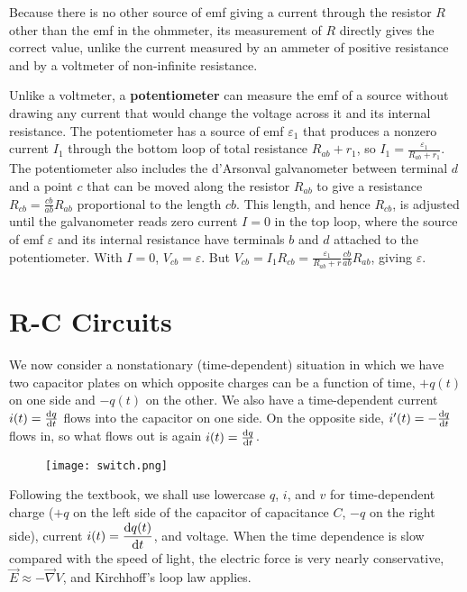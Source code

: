 Because there is no other source of emf giving a current through the resistor $R$ other than the emf in the ohmmeter, its measurement of $R$ directly gives the correct value, unlike the current measured by an ammeter of positive resistance and by a voltmeter of non-infinite resistance.

Unlike a voltmeter, a \textbf{potentiometer} can measure the emf of a source without drawing any current that would change the voltage across it and its internal resistance. The potentiometer has a source of emf $\varepsilon_1$ that produces a nonzero current $I_1$ through the bottom loop of total resistance $R_{ab} + r_1$, so $I_1 = \frac{\varepsilon_1}{R_{ab}+r_1}$. The potentiometer also includes the d'Arsonval galvanometer between terminal $d$ and a point $c$ that can be moved along the resistor $R_{ab}$ to give a resistance $R_{cb} = \frac{cb}{ab}R_{ab}$ proportional to the length $cb$. This length, and hence $R_{cb}$, is adjusted until the galvanometer reads zero current $I = 0$ in the top loop, where the source of emf $\varepsilon$ and its internal resistance have terminals $b$ and $d$ attached to the potentiometer. With $I=0$, $V_{cb} = \varepsilon$. But $V_{cb} = I_1R_{cb} = \frac{\varepsilon_1}{R_{ab} + r} \frac{cb}{ab} R_{ab}$, giving $\varepsilon$.

\section{R-C Circuits}

We now consider a nonstationary (time-dependent) situation in which we have two capacitor plates on which opposite charges can be a function of time, $+q(t)$ on one side and $-q(t)$ on the other. We also have a time-dependent current $i(t) = \frac{\operatorname{d\!} q}{\operatorname{d\!} t}$ flows into the capacitor on one side. On the opposite side, $i'(t) = -\frac{\operatorname{d\!} q}{\operatorname{d\!} t}$ flows in, so what flows out is again $i(t) = \frac{\operatorname{d\!} q}{\operatorname{d\!} t}$. 

\begin{figure}[h]
\centering
\texttt{[image: switch.png]}
\end{figure}

Following the textbook, we shall use lowercase $q$, $i$, and $v$ for time-dependent charge ($+q$ on the left side of the capacitor of capacitance $C$, $-q$ on the right side), current $i(t) = \dfrac{\operatorname{d\!} q(t)}{\operatorname{d\!} t}$, and voltage. When the time dependence is slow compared with the speed of light, the electric force is very nearly conservative, $\vec{E} \approx -\vec{\nabla}V$, and Kirchhoff's loop law applies.


